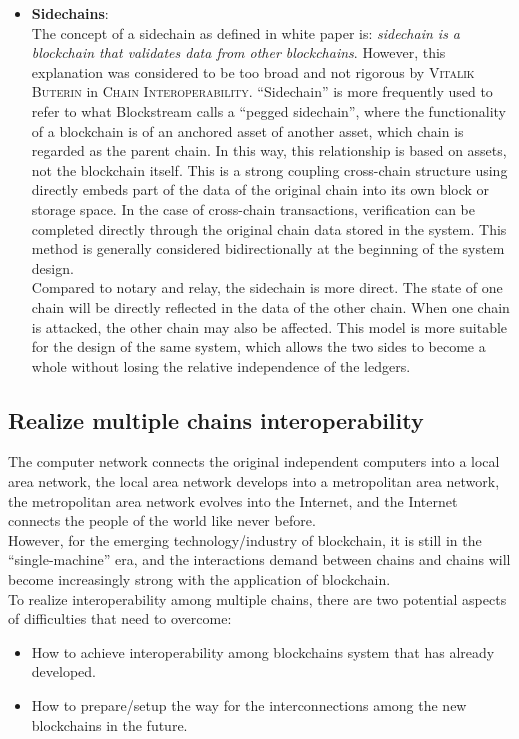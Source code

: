 \begin{itemize}
    \item \textbf{Sidechains}:\\
     The concept of a sidechain as defined in white paper\cite{back2014enabling} is: \textit{sidechain is a blockchain that validates data from other blockchains}. However, this explanation was considered to be too broad and not rigorous by \textsc{Vitalik Buterin} in \textsc{Chain Interoperability}\cite{buterin2016chain}. ``Sidechain'' is more frequently used to refer to what Blockstream calls a ``pegged sidechain'', where the functionality of a blockchain is of an anchored asset of another asset, which chain is regarded as the parent chain. In this way, this relationship is based on assets, not the blockchain itself. This is a strong coupling cross-chain structure using directly embeds part of the data of the original chain into its own block or storage space. In the case of cross-chain transactions,  verification can be completed directly through the original chain data stored in the system. This method is generally considered bidirectionally at the beginning of the system design.\\
     Compared to notary and relay, the sidechain is more direct. The state of one chain will be directly reflected in the data of the other chain. When one chain is attacked, the other chain may also be affected. This model is more suitable for the design of the same system, which allows the two sides to become a whole without losing the relative independence of the ledgers.

\end{itemize}
\subsection{Realize multiple chains interoperability}
\noindent The computer network connects the original independent computers into a local area network, the local area network develops into a metropolitan area network, the metropolitan area network evolves into the Internet, and the Internet connects the people of the world like never before.\\
\noindent However, for the emerging technology/industry of blockchain, it is still in the ``single-machine'' era, and the interactions demand between chains and chains will become increasingly strong with the application of blockchain.\\
\noindent To realize interoperability among multiple chains, there are two potential aspects of difficulties that need to overcome: 
\begin{itemize}
    \item How to achieve interoperability among blockchains system that has already developed.
    \item How to prepare/setup the way for the interconnections among the new blockchains in the future.
\end{itemize}

